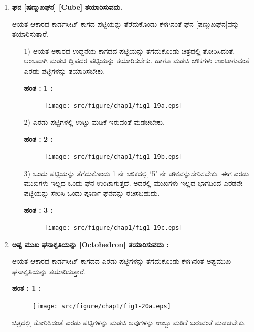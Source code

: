 \begin{enumerate}
\item \textbf{ಘನ [ಷಣ್ಮುಖಘನ] [Cube] ತಯಾರಿಸುವದು. }

ಆಯತ ಆಕಾರದ ಕಾರ್ಡಸೀಟ್ ಕಾಗದ ಪಟ್ಟಿಯನ್ನು ತೆರೆದುಕೊಂಡು ಕೆಳಗಿನಂತೆ ಘನ [ಷಣ್ಮುಖಘನ]ವನ್ನು ತಯಾರಿಸುತ್ತಾರೆ. 
\begin{itemize}
\item[1)] ಆಯತ ಆಕಾರದ ಉದ್ದನೆಯ ಕಾಗದದ ಪಟ್ಟಿಯನ್ನು ತೆಗೆದುಕೊಂಡು ಚಿತ್ರದಲ್ಲಿ ತೋರಿಸಿದಂತೆ, ಲಂಬವಾಗಿ ಮಡಚಿ ದ್ವಿಪದರ ಪಟ್ಟಿಯನ್ನು ತಯಾರಿಸಬೇಕು. ಹಾಗೂ ಮಡಚಿ ಚೌಕಗಳು ಉಂಟಾಗುವಂತೆ ಎರಡು ಪಟ್ಟಿಗಳನ್ನು ತಯಾರಿಸಬೇಕು.

\noindent
\textbf{ಹಂತ : 1 :}
\begin{figure}[H]
\centering
\texttt{[image: src/figure/chap1/fig1-19a.eps]}
\end{figure}

\item[2)] ಎರಡು ಪಟ್ಟಿಗಳಲ್ಲಿ ಉಟ್ಟು ಮಡಿಕೆ ಇರುವಂತೆ ಮಡಚಬೇಕು. 

\eject

\noindent
\textbf{ಹಂತ : 2 :}
\begin{figure}[H]
\centering
\texttt{[image: src/figure/chap1/fig1-19b.eps]}
\end{figure}

\item[3)] ಒಂದು ಪಟ್ಟಿಯನ್ನು ತೆಗೆದುಕೊಂಡು 1 ನೇ ಚೌಕದಲ್ಲಿ `5' ನೇ ಚೌಕವನ್ನು\break ಸೇರಿಸಬೇಕು. ಈಗ ಎರಡು ಮುಖಗಳು ಇಲ್ಲದ ಒಂದು ಘನ ಉಂಟಾಗುತ್ತದೆ. ಅದರಲ್ಲಿ ಮುಖಗಳು ಇಲ್ಲದ ಭಾಗದಿಂದ ಎರಡನೇ ಪಟ್ಟಿಯನ್ನು ಸೇರಿಸಿ ಒಂದು ಪೂರ್ಣ ಘನವನ್ನು ರಚಿಸಬಹುದು. 

\noindent
\textbf{ಹಂತ : 3 :} 
\begin{figure}[H]
\centering
\texttt{[image: src/figure/chap1/fig1-19c.eps]}\\
\hspace{3.5cm} 
\end{figure}
\end{itemize}

\item \textbf{ಅಷ್ಟ ಮುಖ ಘನಾಕೃತಿಯನ್ನು [Octohedron] ತಯಾರಿಸುವದು :}

ಆಯತ ಆಕಾರದ ಕಾರ್ಡಸೀಟ್ ಕಾಗದದ ಎರಡು ಪಟ್ಟಿಗಳನ್ನು ತೆಗೆದುಕೊಂಡು ಕೆಳಗಿನಂತೆ ಅಷ್ಟಮುಖ ಘನಾಕೃತಿಯನ್ನು ತಯಾರಿಸುತ್ತಾರೆ. 

\eject


\noindent
\textbf{ಹಂತ : 1 :}
\begin{figure}[H]
\centering
\texttt{[image: src/figure/chap1/fig1-20a.eps]}
\end{figure}

ಚಿತ್ರದಲ್ಲಿ ತೋರಿಸಿದಂತೆ ಎರಡು ಪಟ್ಟಿಗಳನ್ನು ಮಡಚಿ ಅವುಗಳನ್ನು ಉಬ್ಬು ಮಡಿಕೆ ಬರುವಂತೆ ಮಡಚಬೇಕು.


\end{enumerate}
